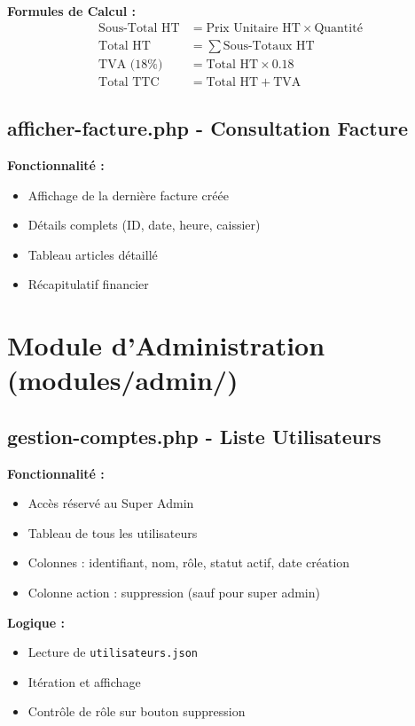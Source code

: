 \documentclass[12pt,a4paper]{report}
\begin{document}
\textbf{Formules de Calcul :}
\begin{align}
\text{Sous-Total HT} &= \text{Prix Unitaire HT} \times \text{Quantité} \\
\text{Total HT} &= \sum \text{Sous-Totaux HT} \\
\text{TVA (18\%)} &= \text{Total HT} \times 0.18 \\
\text{Total TTC} &= \text{Total HT} + \text{TVA}
\end{align}

\subsection{afficher-facture.php - Consultation Facture}

\textbf{Fonctionnalité :}
\begin{itemize}
    \item Affichage de la dernière facture créée
    \item Détails complets (ID, date, heure, caissier)
    \item Tableau articles détaillé
    \item Récapitulatif financier
\end{itemize}

\section{Module d'Administration (modules/admin/)}

\subsection{gestion-comptes.php - Liste Utilisateurs}

\textbf{Fonctionnalité :}
\begin{itemize}
    \item Accès réservé au Super Admin
    \item Tableau de tous les utilisateurs
    \item Colonnes : identifiant, nom, rôle, statut actif, date création
    \item Colonne action : suppression (sauf pour super admin)
\end{itemize}

\textbf{Logique :}
\begin{itemize}
    \item Lecture de \texttt{utilisateurs.json}
    \item Itération et affichage
    \item Contrôle de rôle sur bouton suppression
\end{itemize}
\end{document}
